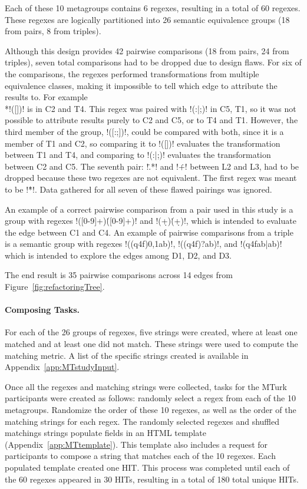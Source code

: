 Each of these 10 metagroups contains 6 regexes, resulting in a total of 60 regexes.  These regexes are logically partitioned into 26 semantic equivalence groups (18 from pairs, 8 from triples).

Although this design provides 42 pairwise comparisons (18 from pairs, 24 from triples),  seven total comparisons had to be dropped due to design flaws.  For six of the comparisons, the regexes performed transformations from multiple equivalence classes, making it impossible to tell which edge to attribute the results to. For example \\*\cverb!([])! is in C2 and T4.  This regex was paired with \cverb!(:|;)! in C5, T1, so it was not possible to attribute results purely to C2 and C5, or to T4 and T1. However, the third member of the group, \cverb!([:;])!, could be compared with both, since it is a member of T1 and C2, so comparing it to \cverb!([])! evaluates the transformation between T1 and T4, and comparing to \cverb!(:|;)! evaluates the transformation between C2 and C5.  The seventh pair: \cverb!\..*! and \cverb!\.+! between L2 and L3, had to be dropped because these two regexes are not equivalent.  The first regex was meant to be \cverb!\.\.*!.  Data gathered for all seven of these flawed pairings was ignored.

An example of a correct pairwise comparison from a pair used in this study is a group with regexes \cverb!([0-9]+)\.([0-9]+)! and  \cverb!(\d+)\.(\d+)!, which is intended to evaluate the edge between C1 and C4.
An example of pairwise comparisons from a triple is a semantic group with regexes \cverb!((q4f){0,1}ab)!, \cverb!((q4f)?ab)!, and \cverb!(q4fab|ab)! which is intended to explore the edges among D1, D2, and D3.

The end result is 35 pairwise comparisons across 14 edges from Figure~\ref{fig:refactoringTree}.

\paragraph{Composing Tasks.}  For each of the 26 groups of regexes, five strings were created, where at least one matched and at least one did not match. These strings were used to compute the matching metric. A list of the specific strings created is available in Appendix~\ref{app:MTstudyInput}.

Once all the regexes and matching strings were collected, tasks for the MTurk participants were created as follows: randomly select a regex from each of the 10 metagroups. Randomize the order of these 10 regexes, as well as the order of the matching strings for each regex. The randomly selected regexes and shuffled matchings strings populate fields in an HTML template (Appendix~\ref{app:MTtemplate}).  This template also includes a request for participants to compose a string that matches each of the 10 regexes.  Each populated template created one HIT.
This process was completed until each of the 60 regexes appeared in 30 HITs, resulting in a total of 180 total unique HITs.

